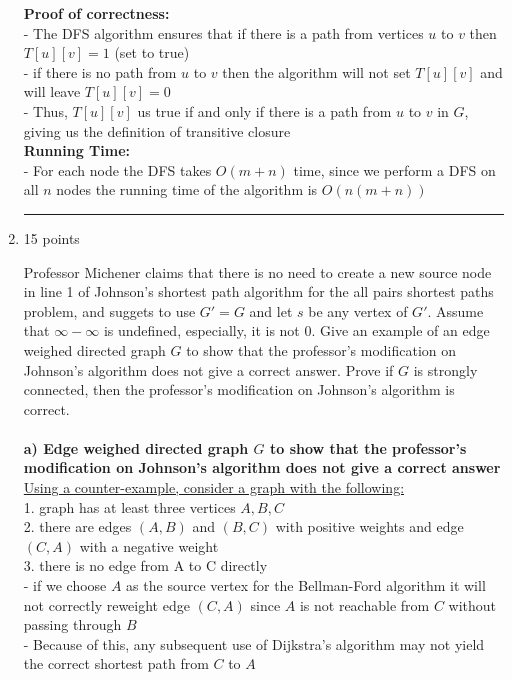 \documentclass[letterpaper,12pt]{article}
\begin{document}
\begin{enumerate}
\textbf{Proof of correctness:}\\
- The DFS algorithm ensures that if there is a path from vertices $u$ to $v$ then $T[u][v]=1$ (set to true) \\
- if there is no path from $u$ to $v$ then the algorithm will not set $T[u][v]$ and will leave $T[u][v]=0$ \\
- Thus, $T[u][v]$ us true if and only if there is a path from $u$ to $v$ in $G$, giving us the definition of transitive closure \\

\textbf{Running Time:} \\
- For each node the DFS takes $O(m+n)$ time, since we perform a DFS on all $n$ nodes the running time of the algorithm is $O(n(m+n))$ \\

\noindent\rule{16cm}{0.1pt}
\item 15 points 

Professor Michener claims that there is no need to create a new source node in
line 1 of Johnson's shortest path algorithm for the all pairs shortest paths problem,
and suggets to use $G'=G$ and let $s$ be any vertex of $G'$. Assume that $\infty-\infty$
is undefined, especially, it is not 0. Give an example of an edge weighed directed graph
$G$ to show that the professor's modification on Johnson's algorithm does not give a
correct answer. Prove if $G$ is strongly connected, then the professor's
modification on Johnson's algorithm is correct. \\ \\
\textbf{a) Edge weighed directed graph $G$ to show that the professor's modification on Johnson's algorithm does not give a correct answer} \\
\underline{Using a counter-example, consider a graph with the following:} \\
1. graph has at least three vertices $A, B, C$ \\
2. there are edges $(A,B)$ and $(B,C)$ with positive weights and edge $(C,A)$ with a negative weight \\
3. there is no edge from A to C directly \\
- if we choose $A$ as the source vertex for the Bellman-Ford algorithm it will not correctly reweight edge $(C,A)$ since $A$ is not reachable from $C$ without passing through $B$ \\
- Because of this, any subsequent use of Dijkstra's algorithm may not yield the correct shortest path from $C$ to $A$ \\


\end{enumerate}
\end{document}
